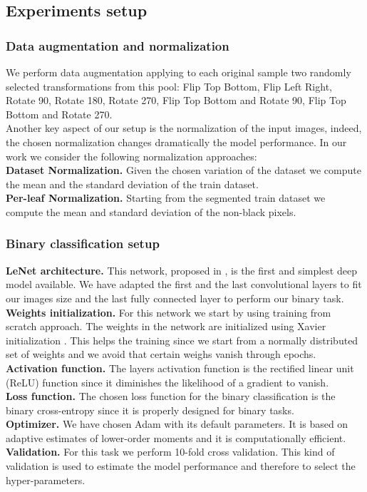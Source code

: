\subsection{Experiments setup}
\subsubsection{Data augmentation and normalization}
We perform data augmentation applying to each original sample two randomly selected transformations from this pool: Flip Top Bottom, Flip Left Right, Rotate 90\degree, Rotate 180\degree, Rotate 270\degree, Flip Top Bottom and Rotate 90\degree, Flip Top Bottom and Rotate 270\degree.
\\
Another key aspect of our setup is the normalization of the input images, indeed, the chosen normalization changes dramatically the model performance. In our work we consider the following normalization approaches:
\\
\textbf{Dataset Normalization.} Given the chosen variation of the dataset we compute the mean and the standard deviation of the train dataset.
\\
\textbf{Per-leaf Normalization.} Starting from the segmented train dataset we compute the mean and standard deviation of the non-black pixels.
\subsubsection{Binary classification setup}
\textbf{LeNet architecture.} This network, proposed in \cite{ref30}, is the first and simplest deep model available. We have adapted the first and the last convolutional layers to fit our images size and the last fully connected layer to perform our binary task.
\\
\textbf{Weights initialization.} For this network we start by using training from scratch approach. The weights in the network are initialized using Xavier initialization \cite{ref31}. This helps the training since we start from a normally distributed set of weights and we avoid that certain weighs vanish through epochs.
\\
\textbf{Activation function.}
The layers activation function is the rectified linear unit (ReLU) function since it diminishes the likelihood of a gradient to vanish.
\\
\textbf{Loss function.}
The chosen loss function for the binary classification is the binary cross-entropy since it is properly designed for binary tasks.
\\
\textbf{Optimizer.}
We have chosen Adam with its default parameters. It is based on adaptive estimates of lower-order moments and it is computationally efficient.
\\
\textbf{Validation.}
For this task we perform 10-fold cross validation. This kind of validation is used to estimate the model performance and therefore to select the hyper-parameters.
